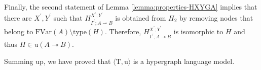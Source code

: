 \documentclass[a4paper,UKenglish,cleveref, autoref, thm-restate,pdfa]{lipics-v2021}
\newcommand{\type}{\mathrm{type}}
\newcommand{\FVar}{\mathrm{FVar}}
\newcommand{\limpl}{\multimap}
\begin{document}
Finally, the second statement of Lemma \ref{lemma:properties-HXYGA} implies that there are $X^\prime,Y^\prime$ such that $H^{X^\prime;Y^\prime}_{\Gamma^\prime;A \limpl B}$ is obtained from $H_2$ by removing nodes that belong to $\FVar(A) \setminus \type(H)$. Therefore, $H^{X^\prime;Y^\prime}_{\Gamma^\prime;A \limpl B}$ is isomorphic to $H$ and thus $H \in \mathrm{u}(A \limpl B)$. 

Summing up, we have proved that $\langle \mathrm{T},\mathrm{u} \rangle$ is a hypergraph language model.
\end{document}
